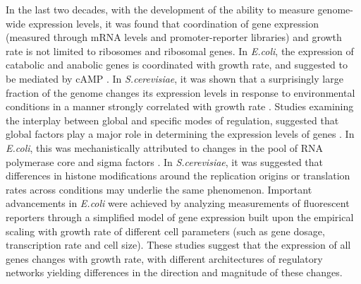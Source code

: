 In the last two decades, with the development of the ability to measure genome-wide expression levels, it was found that coordination of gene expression (measured through mRNA levels and promoter-reporter libraries) and growth rate is not limited to ribosomes and ribosomal genes.
In \emph{E.coli}, the expression of catabolic and anabolic genes is coordinated with growth rate, and suggested to be mediated by cAMP \cite{Saldanha2004}.
In \emph{S.cerevisiae}, it was shown that a surprisingly large fraction of the genome changes its expression levels in response to environmental conditions in a manner strongly correlated with growth rate \cite{Keren2013a,Gasch2000,Castrillo2007,Zaslaver2009, Gerosa2013}.
Studies examining the interplay between global and specific modes of regulation, suggested that global factors play a major role in determining the expression levels of genes \cite{Gasch2000, Klumpp2009a,Scott2010, Berthoumieux2013}.
In \emph{E.coli}, this was mechanistically attributed to changes in the pool of RNA polymerase core and sigma factors \cite{Klumpp2008}.
In \emph{S.cerevisiae}, it was suggested that differences in histone modifications around the replication origins \cite{regenberg2006} or translation rates \cite{Gasch2000} across conditions may underlie the same phenomenon.
Important advancements in \emph{E.coli} were achieved by analyzing measurements of fluorescent reporters through a simplified model of gene expression built upon the empirical scaling with growth rate of different cell parameters (such as gene dosage, transcription rate and cell size)\cite{Klumpp2009a}.
These studies suggest that the expression of all genes changes with growth rate, with different architectures of regulatory networks yielding differences in the direction and magnitude of these changes. 
